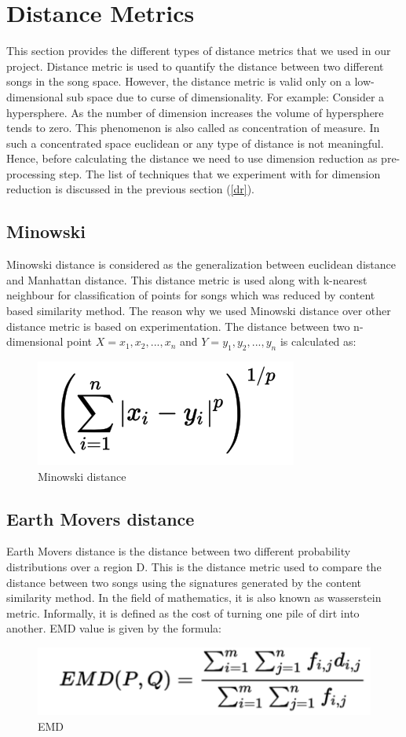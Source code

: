 \documentclass[12pt]{article}
\begin{document}
\section{Distance Metrics}\label{sec:dist}
This section provides the different types of distance metrics that we used in our project. Distance metric is used to quantify the distance between two different songs in the song space. However, the distance metric is valid only on a low-dimensional sub space due to curse of dimensionality. For example: Consider a hypersphere. As the number of dimension increases the volume of hypersphere tends to zero. This phenomenon is also called as concentration of measure. In such a concentrated space euclidean or any type of distance is not meaningful. Hence, before calculating the distance we need to use dimension reduction as pre-processing step. The list of techniques that we experiment with for dimension reduction is discussed in the previous section (\ref{dr}).


\subsection{Minowski}
Minowski distance is considered as the generalization between euclidean distance and Manhattan distance. This distance metric is used along with k-nearest neighbour for classification of points for songs which was reduced by content based similarity method. The reason why we used Minowski distance over other distance metric is based on experimentation. The distance between two n-dimensional point $ X = {x_1,x_2,...,x_n}$ and $ Y = {y_1,y_2,...,y_n} $ is calculated as:
\begin{figure}[h]\label{minowski}
\center
\includegraphics{fig3.png}
\caption{Minowski distance}
\end{figure}
\subsection{Earth Movers distance}
Earth Movers distance is the distance between two different probability distributions over a region D. This is the distance metric used to compare the distance between two songs using the signatures generated by the content similarity method. In the field of mathematics, it is also known as wasserstein metric. Informally, it is defined as the cost of turning one pile of dirt into another. EMD value is given by the formula:
\begin{figure}[h]\label{emd}
\center
\includegraphics[scale=0.5]{emd.png}
\caption{EMD}
\end{figure}
\end{document}
